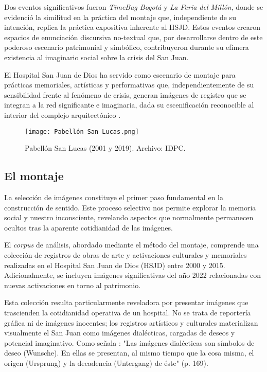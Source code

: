 Dos eventos significativos fueron \textit{TimeBag Bogotá} y \textit{La Feria del Millón}, donde se evidenció la similitud en la práctica del montaje que, independiente de su intención, replica la práctica expositiva inherente al HSJD. Estos eventos crearon espacios de enunciación discursiva no-textual que, por desarrollarse dentro de este poderoso escenario patrimonial y simbólico, contribuyeron durante su efímera existencia al imaginario social sobre la crisis del San Juan.

El Hospital San Juan de Dios ha servido como escenario de montaje para prácticas memoriales, artísticas y performativas que, independientemente de su sensibilidad frente al fenómeno de crisis, generan imágenes de registro que se integran a la red significante e imaginaria, dada su escenificación reconocible al interior del complejo arquitectónico \parencite{BuckMorss1989}.

\begin{figure}[ht]
    \texttt{[image: Pabellón San Lucas.png]}
    \caption{Pabellón San Lucas (2001 y 2019). Archivo: IDPC.}
\end{figure}

\subsection*{El montaje}

La selección de imágenes constituye el primer paso fundamental en la construcción de sentido. Este proceso selectivo nos permite explorar la memoria social y nuestro inconsciente, revelando aspectos que normalmente permanecen ocultos tras la aparente cotidianidad de las imágenes.

El \textit{corpus} de análisis, abordado mediante el método del montaje, comprende una colección de registros de obras de arte y activaciones culturales y memoriales realizadas en el Hospital San Juan de Dios (HSJD) entre 2000 y 2015. Adicionalmente, se incluyen imágenes significativas del año 2022 relacionadas con nuevas activaciones en torno al patrimonio.

Esta colección resulta particularmente reveladora por presentar imágenes que trascienden la cotidianidad operativa de un hospital. No se trata de reportería gráfica ni de imágenes inocentes; los registros artísticos y culturales materializan visualmente el San Juan como imágenes dialécticas, cargadas de deseos y potencial imaginativo. Como señala \parencite{DidiHuberman2011}: "Las imágenes dialécticas son símbolos de deseo (Wunsche). En ellas se presentan, al mismo tiempo que la cosa misma, el origen (Ursprung) y la decadencia (Untergang) de éste" (p. 169).

